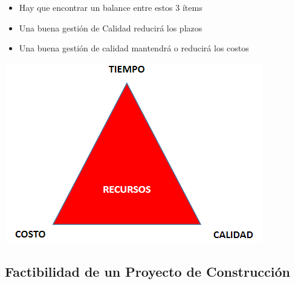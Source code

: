 \documentclass{article} %
\begin{document}
\begin{minipage}{0.45\textwidth}
    \begin{itemize}[label={},left=0pt,align=parleft]
        \item \begin{highlightbox}[levelone] Hay que encontrar un balance entre estos 3 ítems \end{highlightbox}
        \item \begin{highlightbox}[levelone] Una buena gestión de Calidad reducirá los plazos \end{highlightbox}
        \item \begin{highlightbox}[levelone] Una buena gestión de calidad mantendrá o reducirá los costos \end{highlightbox}
    \end{itemize}
\end{minipage}
\hfill
\begin{minipage}{0.45\textwidth}
    \centering
    \includegraphics[width=\textwidth]{gestion_recursos.png}
\end{minipage}

\subsection{Factibilidad de un Proyecto de Construcción}
\end{document}
